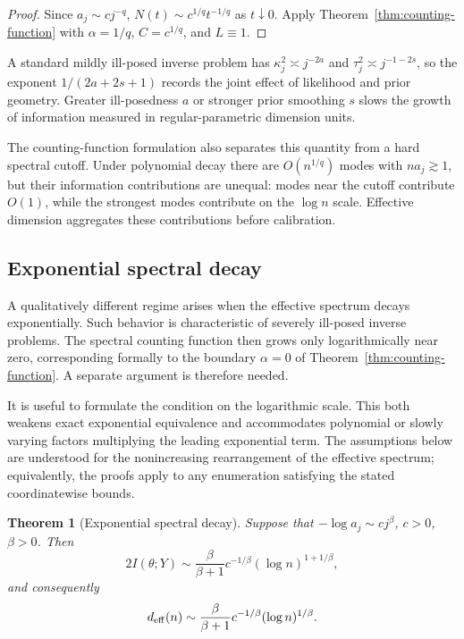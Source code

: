 \documentclass[11pt]{article}
\theoremstyle{plain}
\newtheorem{theorem}{Theorem}
\theoremstyle{definition}
\theoremstyle{remark}
\begin{document}
\begin{proof}
	Since \(a_j\sim cj^{-q}\), \(N(t)\sim c^{1/q}t^{-1/q}\) as \(t\downarrow0\). Apply Theorem~\ref{thm:counting-function} with \(\alpha=1/q\), \(C=c^{1/q}\), and \(L\equiv1\).
\end{proof}

A standard mildly ill-posed inverse problem has \(\kappa_j^2\asymp j^{-2a}\) and \(\tau_j^2\asymp j^{-1-2s}\), so the exponent \(1/(2a+2s+1)\) records the joint effect of likelihood and prior geometry. Greater ill-posedness \(a\) or stronger prior smoothing \(s\) slows the growth of information measured in regular-parametric dimension units.

The counting-function formulation also separates this quantity from a hard spectral cutoff. Under polynomial decay there are \(O(n^{1/q})\) modes with \(na_j\gtrsim1\), but their information contributions are unequal: modes near the cutoff contribute \(O(1)\), while the strongest modes contribute on the \(\log n\) scale. Effective dimension aggregates these contributions before calibration.


\subsection{Exponential spectral decay}
\label{subsec:exponential-spectrum}

A qualitatively different regime arises when the effective spectrum decays exponentially. Such behavior is characteristic of severely ill-posed inverse problems. The spectral counting function then grows only logarithmically near zero, corresponding formally to the boundary \(\alpha=0\) of Theorem~\ref{thm:counting-function}. A separate argument is therefore needed.

It is useful to formulate the condition on the logarithmic scale. This both weakens exact exponential equivalence and accommodates polynomial or slowly varying factors multiplying the leading exponential term. The assumptions below are understood for the nonincreasing rearrangement of the effective spectrum; equivalently, the proofs apply to any enumeration satisfying the stated coordinatewise bounds.

\begin{theorem}[Exponential spectral decay]
	\label{thm:exponential-spectrum}
	Suppose that \(-\log a_j\sim cj^\beta\), \(c>0\), \(\beta>0\). Then
	\[
	2I(\theta;Y)
	\sim
	\frac{\beta}{\beta+1}c^{-1/\beta}(\log n)^{1+1/\beta},
	\]
	and consequently
	\[
	d_{\rm eff}(n)
	\sim
	\frac{\beta}{\beta+1}c^{-1/\beta}(\log n)^{1/\beta}.
	\]
\end{theorem}
\end{document}
